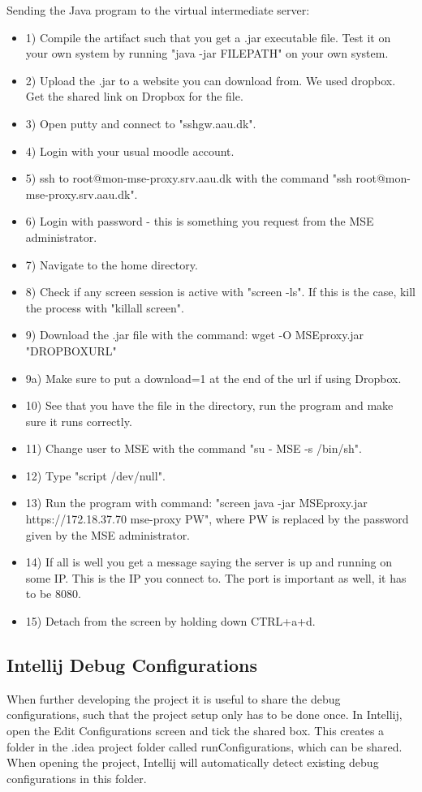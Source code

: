 Sending the Java program to the virtual intermediate server:
\begin{itemize}
\item 1) Compile the artifact such that you get a .jar executable file. Test it on your own system by running "java -jar FILEPATH" on your own system.
\item 2) Upload the .jar to a website you can download from. We used dropbox. Get the shared link on Dropbox for the file.
\item 3) Open putty and connect to "sshgw.aau.dk".
\item 4) Login with your usual moodle account.
\item 5) ssh to root@mon-mse-proxy.srv.aau.dk with the command "ssh root@mon-mse-proxy.srv.aau.dk".
\item 6) Login with password - this is something you request from the MSE administrator.
\item 7) Navigate to the home directory.
\item 8) Check if any screen session is active with "screen -ls". If this is the case, kill the process with "killall screen".
\item 9) Download the .jar file with the command: wget -O MSEproxy.jar "DROPBOXURL" 
\item 9a) Make sure to put a download=1 at the end of the url if using Dropbox.
\item 10) See that you have the file in the directory, run the program and make sure it runs correctly.
\item 11) Change user to MSE with the command "su - MSE -s /bin/sh".
\item 12) Type "script /dev/null".
\item 13) Run the program with command: "screen java -jar MSEproxy.jar https://172.18.37.70 mse-proxy PW", where PW is replaced by the password given by the MSE administrator.
\item 14) If all is well you get a message saying the server is up and running on some IP. This is the IP you connect to. The port is important as well, it has to be 8080.
\item 15) Detach from the screen by holding down CTRL+a+d.
\end{itemize}

\subsection*{Intellij Debug Configurations}
When further developing the project it is useful to share the debug configurations, such that the project setup only has to be done once. In Intellij, open the Edit Configurations screen and tick the shared box. This creates a folder in the .idea project folder called runConfigurations, which can be shared. When opening the project, Intellij will automatically detect existing debug configurations in this folder.



